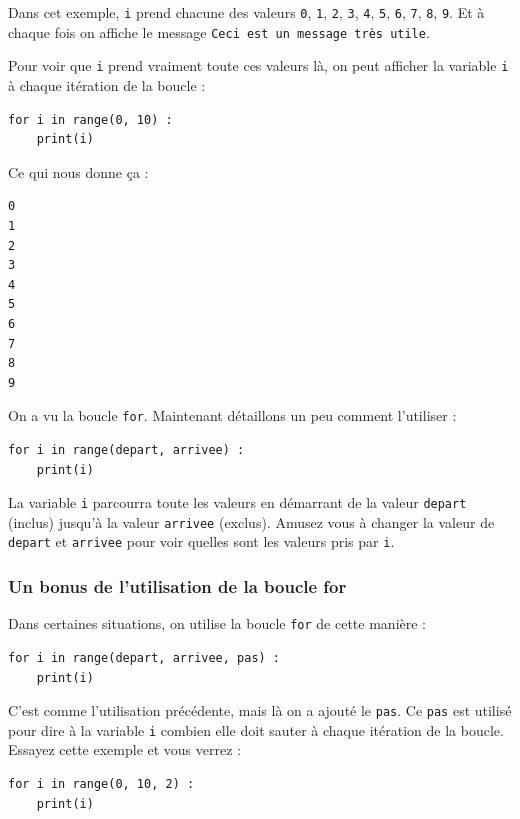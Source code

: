 \documentclass[12pt]{article}
\newcommand{\code}[1]{\colorbox{light-gray}{\texttt{#1}}}
\begin{document}
            Dans cet exemple, \code{i} prend chacune des valeurs \code{0}, \code{1}, \code{2}, \code{3}, \code{4}, \code{5}, 
            \code{6}, \code{7}, \code{8}, \code{9}. Et à chaque fois on affiche le message \code{Ceci est un 
            message très utile}.

            Pour voir que \code{i} prend vraiment toute ces valeurs là, on peut afficher la variable \code{i} à chaque
            itération de la boucle :
            \begin{lstlisting}[style=code]
for i in range(0, 10) :
    print(i)
            \end{lstlisting}

            Ce qui nous donne ça :
            \begin{lstlisting}[style=exec_result]
0
1
2
3
4
5
6
7
8
9
            \end{lstlisting}

            On a vu la boucle \code{for}. Maintenant détaillons un peu comment l'utiliser :
            \begin{lstlisting}[style=code]
for i in range(depart, arrivee) :
    print(i)
            \end{lstlisting}

            La variable \code{i} parcourra toute les valeurs en démarrant de la valeur \code{depart} (inclus) 
            jusqu'à la valeur \code{arrivee} (exclus). Amusez vous à changer la valeur de \code{depart}
            et \code{arrivee} pour voir quelles sont les valeurs pris par \code{i}.

        \subsubsection{Un bonus de l'utilisation de la boucle for}

            Dans certaines situations, on utilise la boucle \code{for} de cette manière :
            \begin{lstlisting}[style=code]
for i in range(depart, arrivee, pas) :
    print(i)
            \end{lstlisting}

            C'est comme l'utilisation précédente, mais là on a ajouté le \code{pas}. Ce \code{pas} est utilisé pour dire à 
            la variable \code{i} combien elle doit sauter à chaque itération de la boucle. Essayez cette exemple et vous 
            verrez :
            \begin{lstlisting}[style=code]
for i in range(0, 10, 2) :
    print(i)
            \end{lstlisting}
\end{document}
